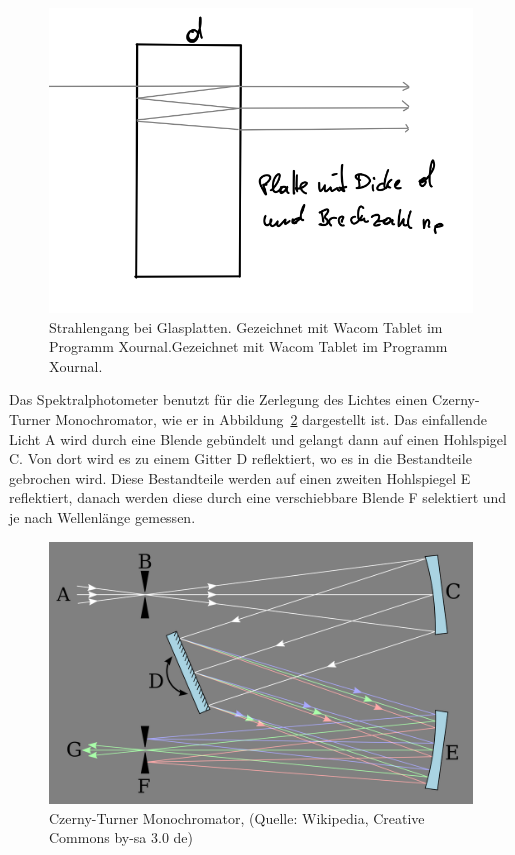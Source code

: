 \documentclass{article}
\begin{document}
\begin{figure}[H]
\caption{Strahlengang bei Glasplatten. Gezeichnet mit Wacom Tablet im Programm Xournal.Gezeichnet mit Wacom Tablet im Programm Xournal.}
\label{fig:aufbau3}
\includegraphics[scale=1.]{aufbau3.png}
\end{figure}


Das Spektralphotometer benutzt für die Zerlegung des Lichtes einen Czerny-Turner Monochromator, wie er in Abbildung~\ref{fig:monochromator} dargestellt ist. Das einfallende Licht A wird durch eine Blende gebündelt und gelangt dann auf einen Hohlspigel C. Von dort wird es zu einem Gitter D reflektiert, wo es in die Bestandteile gebrochen wird. Diese Bestandteile werden auf einen zweiten Hohlspiegel E reflektiert, danach werden diese durch eine verschiebbare Blende F selektiert und je nach Wellenlänge gemessen.

\begin{figure}[H]
\caption{Czerny-Turner Monochromator, (Quelle: Wikipedia, Creative Commons by-sa 3.0 de)}
\label{fig:monochromator}
\includegraphics[scale=0.1]{monochromator.png}
\end{figure}
\end{document}
